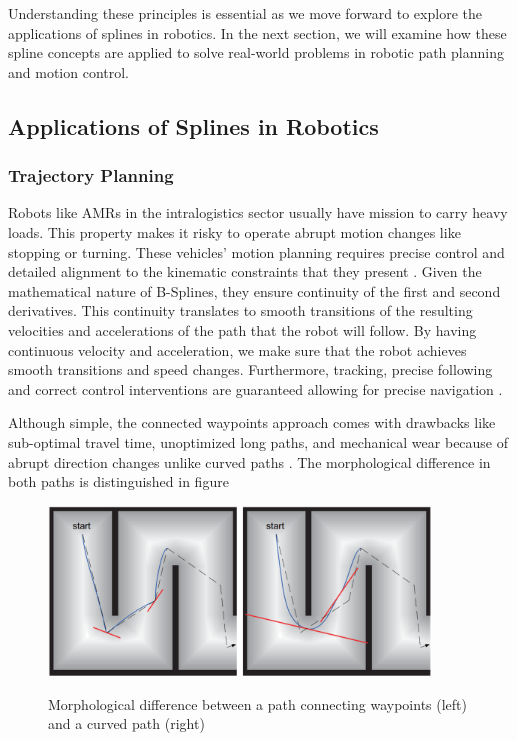Understanding these principles is essential as we move forward to explore the applications of splines 
in robotics. In the next section, we will examine how these spline concepts are applied to solve 
real-world problems in robotic path planning and motion control.

\subsection{Applications of Splines in Robotics}
\subsubsection{Trajectory Planning} 
Robots like AMRs in the intralogistics sector usually have mission to carry heavy loads. 
This property makes it risky to operate abrupt motion changes like stopping or turning.
These vehicles' motion planning requires precise control and detailed alignment to the 
kinematic constraints that they present \cite{R30}.
Given the mathematical nature of B-Splines, they ensure continuity of the first and second derivatives.
This continuity translates to smooth transitions of the resulting velocities and accelerations of the path
that the robot will follow. By having continuous velocity and acceleration, we make sure that the robot
achieves smooth transitions and speed changes. Furthermore, tracking, precise following and correct control
interventions are guaranteed allowing for precise navigation \cite{R30}. 

 
Although simple,
the connected waypoints approach comes with drawbacks like sub-optimal travel time, unoptimized long paths, 
and mechanical wear because of abrupt direction changes unlike curved paths \cite{R30}. The morphological 
difference in both paths is distinguished in figure  

\begin{figure}[H]
    \begin{center}
        \includegraphics[width=4in]{images/Chap1/sharp-vs-curved-path.png}\\
        \caption{Morphological difference between a path connecting waypoints (left) and a curved path 
        (right) \cite{R30}}
        \label{paths}
    \end{center}
\end{figure}

